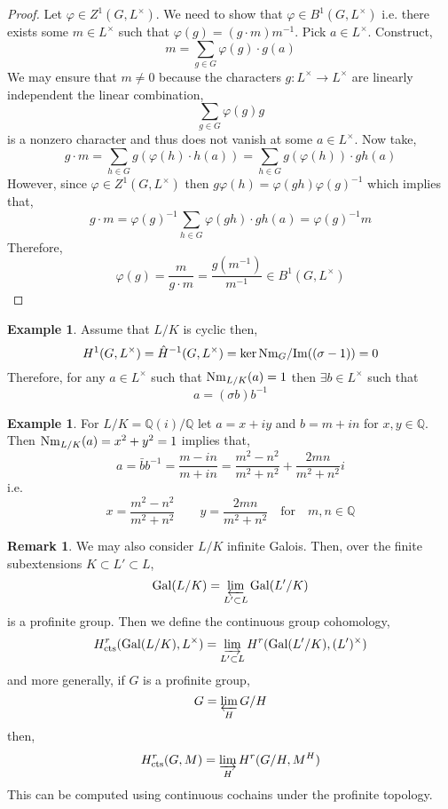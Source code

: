 \documentclass[12pt]{extarticle}
\newcommand{\Q}{\mathbb{Q}}
\renewcommand{\Im}[1]{\mathrm{Im}(#1)}
\theoremstyle{definition}
\newtheorem{remark}[theorem]{Remark}
\newtheorem{example}[theorem]{Example}
\begin{document}
\begin{proof}
Let $\varphi \in Z^1(G, L^\times)$. We need to show that $\varphi \in B^1(G, L^\times)$ i.e. there exists some $m \in L^\times$ such that $\varphi(g) = (g \cdot m)m^{-1}$. Pick $a \in L^\times$. Construct,
\[ m = \sum_{g \in G} \varphi(g) \cdot g(a) \]
We may ensure that $m \neq 0$ because the characters $g : L^\times \to L^\times$ are linearly independent the linear combination,
\[ \sum_{g \in G} \varphi(g) g \]
is a nonzero character and thus does not vanish at some $a \in L^\times$. Now take,
\[ g \cdot m = \sum_{h \in G}  g \left( \varphi(h) \cdot h(a) \right) = \sum_{h \in G} g(\varphi(h)) \cdot gh(a) \]
However, since $\varphi \in Z^1(G, L^\times)$ then $g \varphi(h) = \varphi(gh) \varphi(g)^{-1}$ which implies that,
\[ g \cdot m = \varphi(g)^{-1} \sum_{h \in G} \varphi(gh) \cdot gh(a) = \varphi(g)^{-1} m \]
Therefore,
\[ \varphi(g) = \frac{m}{g \cdot m} = \frac{g(m^{-1})}{m^{-1}} \in B^1(G, L^\times) \]  
\end{proof}

\begin{example}
Assume that $L / K$ is cyclic then,
\[ H^1(G, L^\times) = \hat{H}^{-1}(G, L^\times) = \ker{\Nm_G} / \Im{(\sigma - 1)}  = 0 \]
Therefore, for any $a \in L^\times$ such that $\mathrm{Nm}_{L / K}(a) = 1$ then $\exists b \in L^\times$ such that 
\[ a = (\sigma b) b^{-1} \]
\end{example}

\begin{example}
For $L / K = \Q(i) / \Q$ let $a = x + i y$ and $b = m + i n$ for $x, y \in \Q$. Then $\mathrm{Nm}_{L/K}(a) = x^2 + y^2 = 1$ implies that,
\[ a = \bar{b} b^{-1} = \frac{m - i n}{m + i n} = \frac{m^2 - n^2}{m^2 + n^2} + \frac{2 mn}{m^2 + n^2} i \]
i.e.
\[ x = \frac{m^2 - n^2}{m^2 + n^2} \quad \quad y = \frac{2 mn}{m^2 +  n^2} \quad \text{for} \quad m,n \in \Q \]
\end{example}

\begin{remark}
We may also consider $L / K$ infinite Galois. Then, over the finite subextensions $K \subset L' \subset L$,
\[ \mathrm{Gal} (L/K) = \varprojlim_{L' \subset L} \mathrm{Gal} (L'/K) \]
is a profinite group. Then we define the continuous group cohomology,
\[ H^r_{\text{cts}}(\mathrm{Gal} (L/K), L^\times) = \varinjlim_{L' \subset L} H^r(\mathrm{Gal} (L'/K), (L')^\times) \] 
and more generally, if $G$ is a profinite group,
\[ G = \varprojlim_{H} G / H \]
then,
\[ H^r_{\text{cts}}(G, M) = \varinjlim_{H} H^r(G / H, M^H) \]
This can be computed using continuous cochains under the profinite topology. 
\end{remark}
\end{document}
